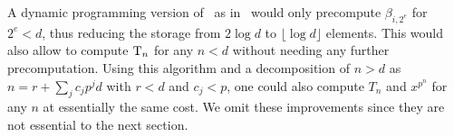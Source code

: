 \begin{remark}
  A dynamic programming version of~ as
  in~\todo\cite[Algorithm~5.2]{vzGS92} would only precompute
  $\beta_{i,2^e}$ for $2^e<d$, thus reducing the storage from $2\log
  d$ to $\lfloor\log d\rfloor$ elements. This would also allow to
  compute $\operatorname{T}_n$ for any $n<d$ without needing any further
  precomputation. Using this algorithm and a decomposition of $n>d$ as
  $n=r+\sum_jc_jp^jd$ with $r<d$ and $c_j<p$, one could also compute
  $T_{n}$ and $x^{p^n}$ for any $n$ at essentially the same cost. We
  omit these improvements since they are not essential to the next
  section.
\end{remark}

%
